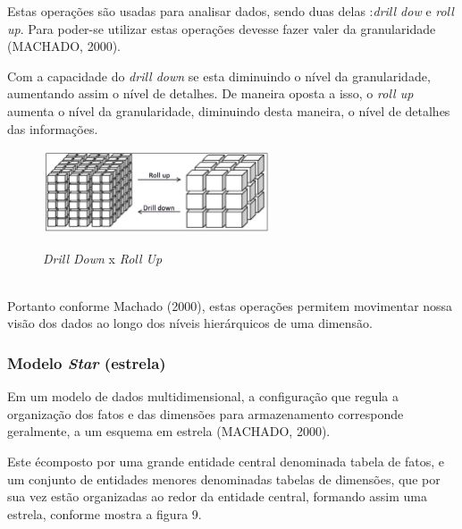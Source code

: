 Estas operações são usadas para analisar dados, sendo duas delas
:\textit{drill dow} e \textit{roll up}. Para poder-se utilizar estas operações devesse fazer valer da granularidade (MACHADO, 2000).

Com a capacidade do \textit{drill down} se esta diminuindo o nível da granularidade, aumentando assim o nível de detalhes. De maneira oposta a isso, 
o \textit{roll up} aumenta o nível da granularidade, diminuindo desta maneira, o nível de detalhes das informações.

\begin{figure}[H]
	\vspace*{0,2cm}
    \centering
    \caption{\textit{Drill Down} x  \textit{Roll Up}}
    \includegraphics[width=0.6\textwidth]{./04-figuras/figura-08}
    \label{fig:ilustfig08}
\end{figure}
\vspace*{-0,9cm}
{\raggedright {}}\\

Portanto conforme Machado (2000), estas operações permitem movimentar nossa visão dos dados ao longo dos níveis hierárquicos de uma dimensão.

\subsubsection{Modelo \textit{Star} (estrela)}

Em um modelo de dados multidimensional, a configuração que regula a organização dos fatos e das dimensões para armazenamento corresponde geralmente, a um esquema em estrela (MACHADO, 2000).

Este \'{e}composto por uma grande entidade central denominada tabela de fatos, e um conjunto de entidades menores denominadas tabelas de dimensões, que por sua vez estão organizadas ao redor da entidade central, formando assim uma estrela, conforme mostra a figura 9.

